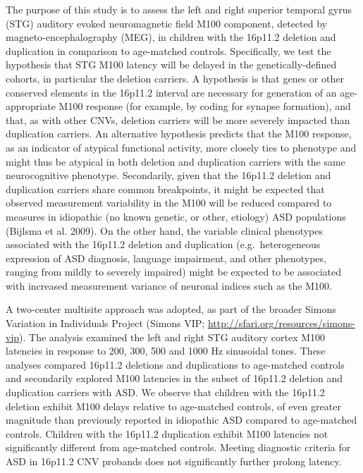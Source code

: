 \documentclass[]{article}
\begin{document}
The purpose of this study is to assess the left and right superior
temporal gyrus (STG) auditory evoked neuromagnetic field M100 component,
detected by magneto-encephalography (MEG), in children with the 16p11.2
deletion and duplication in comparison to age-matched controls.
Specifically, we test the hypothesis that STG M100 latency will be
delayed in the genetically-defined cohorts, in particular the deletion
carriers. A hypothesis is that genes or other conserved elements in the
16p11.2 interval are necessary for generation of an age-appropriate M100
response (for example, by coding for synapse formation), and that, as
with other CNVs, deletion carriers will be more severely impacted than
duplication carriers. An alternative hypothesis predicts that the M100
response, as an indicator of atypical functional activity, more closely
ties to phenotype and might thus be atypical in both deletion and
duplication carriers with the same neurocognitive phenotype.
Secondarily, given that the 16p11.2 deletion and duplication carriers
share common breakpoints, it might be expected that observed measurement
variability in the M100 will be reduced compared to measures in
idiopathic (no known genetic, or other, etiology) ASD populations
(Bijlsma et al. 2009). On the other hand, the variable clinical
phenotypes associated with the 16p11.2 deletion and duplication
(e.g.~heterogeneous expression of ASD diagnosis, language impairment,
and other phenotypes, ranging from mildly to severely impaired) might be
expected to be associated with increased measurement variance of
neuronal indices such as the M100.\\\medskip

A two-center multisite approach was adopted, as part of the broader
Simons Variation in Individuals Project (Simons VIP;
\url{http://sfari.org/resources/simons-vip}). The analysis examined the
left and right STG auditory cortex M100 latencies in response to 200,
300, 500 and 1000 Hz sinusoidal tones. These analyses compared 16p11.2
deletions and duplications to age-matched controls and secondarily
explored M100 latencies in the subset of 16p11.2 deletion and
duplication carriers with ASD. We observe that children with the 16p11.2
deletion exhibit M100 delays relative to age-matched controls, of even
greater magnitude than previously reported in idiopathic ASD compared to
age-matched controls. Children with the 16p11.2 duplication exhibit M100
latencies not significantly different from age-matched controls. Meeting
diagnostic criteria for ASD in 16p11.2 CNV probands does not
significantly further prolong latency.
\end{document}
